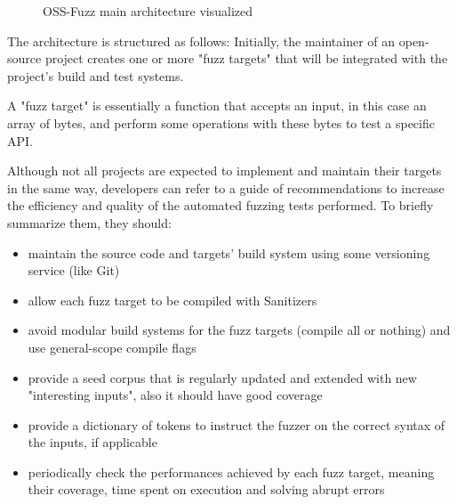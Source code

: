 \begin{figure}[h]
\caption{OSS-Fuzz main architecture visualized \cite{ossfuzz_docs}}
\label{fig:ossfuzz_architecture}
\end{figure}

The architecture is structured as follows:
Initially, the maintainer of an open-source project creates one or more "fuzz targets" that will be integrated with the project's build and test systems. \cite{libfuzzer_docs}

A "fuzz target" is essentially a function that accepts an input, in this case an array of bytes, and perform some operations with these bytes to test a specific API.

Although not all projects are expected to implement and maintain their targets in the same way, developers can refer to a guide of recommendations to increase the efficiency and quality of the automated fuzzing tests performed.
To briefly summarize them, they should:
\begin{itemize}
    \item maintain the source code and targets' build system using some versioning service (like Git)
    \item allow each fuzz target to be compiled with Sanitizers
    \item avoid modular build systems for the fuzz targets (compile all or nothing) and use general-scope compile flags
    \item provide a seed corpus that is regularly updated and extended with new "interesting inputs", also it should have good coverage
    \item provide a dictionary of tokens to instruct the fuzzer on the correct syntax of the inputs, if applicable
    \item periodically check the performances achieved by each fuzz target, meaning their coverage, time spent on execution and solving abrupt errors
\end{itemize}

